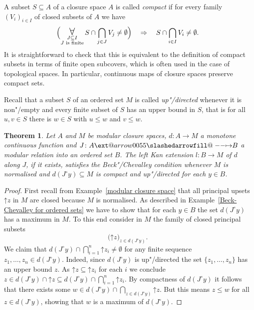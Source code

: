 \documentclass[preprint, a4paper]{elsarticle}
\makeatletter
\def\slashedarrowfill@#1#2#3#4#5{%
  $\m@th\thickmuskip0mu\medmuskip\thickmuskip\thinmuskip\thickmuskip
   \relax#5#1\mkern-7mu%
   \cleaders\hbox{$#5\mkern-2mu#2\mkern-2mu$}\hfill
   \mathclap{#3}\mathclap{#2}%
   \cleaders\hbox{$#5\mkern-2mu#2\mkern-2mu$}\hfill
   \mkern-7mu#4$%
}
\def\rightslashedarrowfill@{%
  \slashedarrowfill@\relbar\relbar\mapstochar\rightarrow}
\newcommand\xslashedrightarrow[2][]{%
  \ext@arrow 0055{\rightslashedarrowfill@}{#1}{#2}}
\def\slashedrightarrow{\xslashedrightarrow{}}
\newtheorem{theorem}{Theorem}[section]
\theoremstyle{definition}
\theoremstyle{remark}
\providecommand{\exref}[1]{Example~\ref{#1}}
\renewcommand{\implies}{\Rightarrow}
\providecommand{\brcs}[1]{\lbrace #1 \rbrace}
\providecommand{\bigpars}[1]{\bigl(#1\bigr)}
\providecommand{\Bigpars}[1]{\Bigl(#1\Bigr)}
\providecommand{\set}[1]{\brcs{#1}}
\providecommand{\isect}{\cap}
\providecommand{\Isect}{\bigcap}
\DeclareMathOperator\ForallOp{\mbox{\Large $\mathsurround0pt\forall$}}
\newcommand\Forall{\ForallOp\displaylimits}
\providecommand{\upset}{\mathord\uparrow}
\providecommand{\rev}[1]{#1^\circ}
\providecommand{\map}[3]{#1\colon#2\to#3}
\providecommand{\hmap}[3]{#1\colon#2\slashedrightarrow#3}
\providecommand{\2}{\mathsf 2}
\makeatother
\begin{document}
	A subset $S \subseteq A$ of a closure space $A$ is called \emph{compact} if for every family $(V_i)_{i \in I}$ of closed subsets of $A$ we have
	\begin{displaymath}
		\Bigpars{\Forall_{\substack{J \subseteq I\\ \text{$J$ is finite}}} S \isect \Isect_{j \in J} V_j \neq \emptyset} \quad \implies \quad S \isect \Isect_{i \in I} V_i \neq \emptyset.
	\end{displaymath}
	It is straightforward to check that this is equivalent to the definition of compact subsets in terms of finite open subcovers, which is often used in the case of topological spaces. In particular, continuous maps of closure spaces preserve compact sets.
	
	Recall that a subset $S$ of an ordered set $M$ is called \emph{up"/directed} whenever it is non"/empty and every finite subset of $S$ has an upper bound in $S$, that is for all $u, v \in S$ there is $w \in S$ with $u \leq w$ and $v \leq w$.
	
	\begin{theorem} \label{extreme value theorem for ordered closure spaces}
		Let $A$ and $M$ be modular closure spaces, $\map dAM$ a monotone continuous function and $\hmap JAB$ a modular relation into an ordered set $B$. The left Kan extension $\map lBM$ of $d$ along $J$, if it exists, satisfies the Beck"/Chevalley condition whenever $M$ is normalised and $d(\rev Jy) \subseteq M$ is compact and up"/directed for each $y \in B$.
	\end{theorem}
	\begin{proof}
		First recall from \exref{modular closure space} that all principal upsets $\upset z$ in $M$ are closed because $M$ is normalised. As described in \exref{Beck-Chevalley for ordered sets} we have to show that for each $y \in B$ the set $d(\rev Jy)$ has a maximum in $M$. To this end consider in $M$ the family of closed principal subsets
		\begin{displaymath}
			\bigpars{\upset z}_{z \in d(\rev Jy)}.
		\end{displaymath}
		We claim that $d(\rev Jy) \isect \Isect_{i = 1}^n \upset z_i \neq \emptyset$ for any finite sequence $z_1, \dotsc, z_n \in d(\rev J y)$. Indeed, since $d(\rev Jy)$ is up"/directed the set $\set{z_1, \dotsc, z_n}$ has an upper bound $z$. As $\upset z \subseteq \upset z_i$ for each $i$ we conclude $z \in d(\rev Jy) \isect \upset z \subseteq d(\rev Jy) \isect \Isect_{i = 1}^n \upset z_i$. By compactness of $d(\rev Jy)$ it follows that there exists some $w \in d(\rev J y) \isect \Isect_{z \in d(\rev Jy)} \upset z$. But this means $z \leq w$ for all $z \in d(\rev Jy)$, showing that $w$ is a maximum of $d(\rev Jy)$.
	\end{proof}
	
\end{document}
